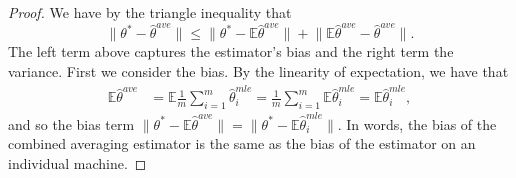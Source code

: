 \documentclass[twoside]{article}
\newcommand{\E}{\mathbb{E}}
\newcommand{\w}{\theta}
\newcommand{\wave}{\hat\w^{ave}}
\newcommand{\wmle}{\hat\w^{mle}}
\newcommand{\wstar}{{\w^{*}}}
\newcommand{\ltwo}[1]{{\lVert {#1} \rVert}}
\begin{document}
\begin{proof}
We have by the triangle inequality that
\begin{equation}
\ltwo{\wstar-\wave} \le \ltwo{\wstar-\E\wave} + \ltwo{\E\wave-\wave}
.
\label{eq:biasvar}
\end{equation}
The left term above captures the estimator's bias and the right term the variance.
First we consider the bias.
By the linearity of expectation, we have that
\begin{align}
\E\wave
&=
\E\frac{1}{m}\sum_{i=1}^m\wmle_i
=
\frac{1}{m}\sum_{i=1}^m\E\wmle_i
=
\E\wmle_i
,
\label{eq:expwave}
\end{align}
and so the bias term
$\ltwo{\wstar-\E\wave}
=
\ltwo{\wstar-\E\wmle_i}
$.
In words, the bias of the combined averaging estimator is the same as the bias of the estimator on an individual machine.


\end{proof}
\end{document}
